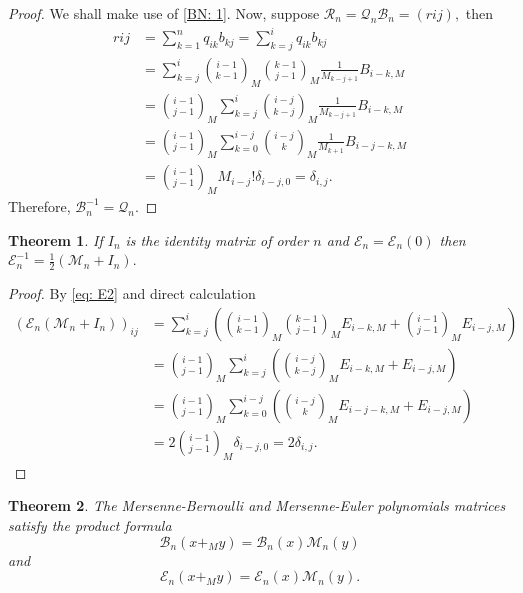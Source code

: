 \documentclass[12pt, a4paper]{article}
\newtheorem{theorem}{Theorem}[section]
\begin{document}
\begin{proof}
We shall make use of \eqref{BN: 1}. Now, suppose $\mathcal{R}_n = \mathcal{Q}_n\mathcal{B}_n = (r{ij}),$ then 
\begin{align*}
r{ij} &= \sum_{k=1}^{n}q_{ik}b_{kj} = \sum_{k=j}^{i}q_{ik}b_{kj}\\
&= \sum_{k=j}^{i} \binom{i-1}{k-1}_M \binom{k-1}{j-1}_M\frac{1}{M_{k-j+1}}B_{i-k,M}\\
&= \binom{i-1}{j-1}_M\sum_{k=j}^{i} \binom{i-j}{k-j}_M\frac{1}{M_{k-j+1}} B_{i-k,M}\\
&= \binom{i-1}{j-1}_M\sum_{k=0}^{i-j} \binom{i-j}{k}_M\frac{1}{M_{k+1}} B_{i-j-k,M}\\
&= \binom{i-1}{j-1}_M M_{i-j}!\delta_{i-j,0} = \delta_{i,j}.
\end{align*}
Therefore, $\mathcal{B}_n^{-1} = \mathcal{Q}_n.$
\end{proof}
\begin{theorem}
If $I_n$ is the identity matrix of order $n$ and $\mathcal{E}_n = \mathcal{E}_n(0)$ then $\mathcal{E}_n^{-1} = \frac{1}{2}(\mathcal{M}_n+I_n).$
\end{theorem}
\begin{proof}
By \eqref{eq: E2} and direct calculation
\begin{align*}
\left(\mathcal{E}_n\left(\mathcal{M}_n+I_n\right)\right)_{ij} &= \sum_{k=j}^{i} \left(\binom{i-1}{k-1}_M\binom{k-1}{j-1}_ME_{i-k,M}+\binom{i-1}{j-1}_ME_{i-j,M}\right)\\
&= \binom{i-1}{j-1}_M\sum_{k=j}^{i}\left(\binom{i-j}{k-j}_ME_{i-k,M}+E_{i-j,M}\right)\\
&= \binom{i-1}{j-1}_M\sum_{k=0}^{i-j}\left(\binom{i-j}{k}_ME_{i-j-k,M}+E_{i-j,M}\right)\\
&= 2\binom{i-1}{j-1}_M\delta_{i-j,0}= 2\delta_{i,j}.
\end{align*}
\end{proof}
\begin{theorem}
The Mersenne-Bernoulli and Mersenne-Euler polynomials matrices
satisfy the product formula
\begin{equation}
\mathcal{B}_n(x+_My) = \mathcal{B}_n(x)\mathcal{M}_n(y)
\end{equation}
and 
\begin{equation}
\mathcal{E}_n(x+_My) = \mathcal{E}_n(x)\mathcal{M}_n(y).
\end{equation}
\end{theorem}
\end{document}
